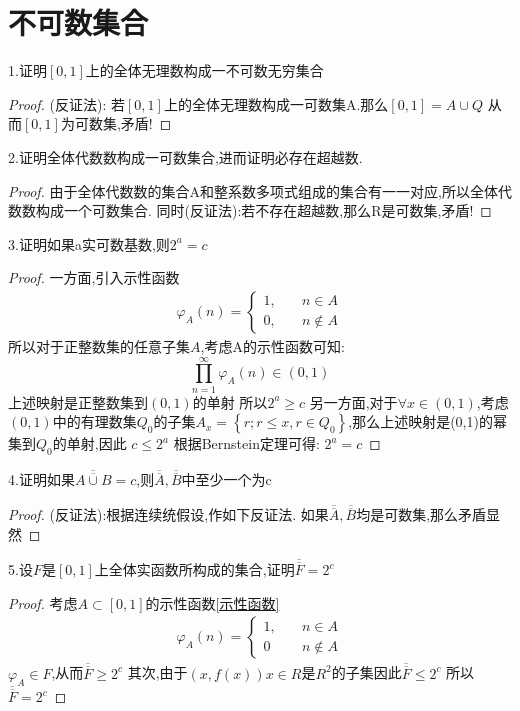 \section{不可数集合}
1.证明\([0,1]\)上的全体无理数构成一不可数无穷集合
\begin{proof}
   (反证法):  若\([0,1]\)上的全体无理数构成一可数集A.那么\([0,1] = A\cup Q \) 从而\([0,1]\)为可数集,矛盾!
\end{proof}
2.证明全体代数数构成一可数集合,进而证明必存在超越数.
\begin{proof}
    由于全体代数数的集合A和整系数多项式组成的集合有一一对应,所以全体代数数构成一个可数集合.
    同时(反证法):若不存在超越数,那么R是可数集,矛盾!
\end{proof}
3.证明如果a实可数基数,则\(2^a =c\)
\begin{proof}
    一方面,引入示性函数
    \begin{align}\label{示性函数}
        \varphi_{A}(n)=\begin{cases}
            1, \quad&n\in A\\ 
            0,\quad &n \notin A
        \end{cases}
    \end{align}
    所以对于正整数集的任意子集\(A\),考虑A的示性函数可知:
    \[\prod_{n=1}^{\infty}\varphi_A (n) \in (0,1)\] 
    上述映射是正整数集到\((0,1)\)的单射
    所以\(2^a \geq c\)
    另一方面,对于\(\forall x \in (0,1)\),考虑\((0,1)\)中的有理数集\(Q_0\)的子集\(A_x=\left\{r;r\leq x , r\in Q_0 \right\}\),那么上述映射是(0,1)的幂集到\(Q_0\)的单射,因此 \(c \leq 2^a\)
    根据Bernstein定理可得: \(2^a = c\)
\end{proof}
4.证明如果\(\overline{\overline{A \cup B}} =c\),则\(\overline{\overline{A}},\overline{\overline{B}}\)中至少一个为c
\begin{proof}
    (反证法):根据连续统假设,作如下反证法. 如果\(\overline{\overline{A}},\overline{\overline{B}}\)均是可数集,那么矛盾显然
\end{proof}
5.设\(F\)是\([0,1]\)上全体实函数所构成的集合,证明\(\overline{\overline{F}}= 2^c\)
\begin{proof}
    考虑\(A \subset [0,1]\)的示性函数\ref{示性函数}\begin{align*}
        \varphi_A(n)=\begin{cases}
            1,\quad &n\in A \\ 
            0 \quad & n \notin A 
        \end{cases}
    \end{align*}
    \(\varphi_A \in F\),从而\(\overline{\overline{F}} \geq 2^c\)
    其次,由于\((x,f(x)) x \in R\)是\(R^2\)的子集因此\(\overline{\overline{F}} \leq 2^c\)
    所以\(\overline{\overline{F}} = 2^c\)
\end{proof}
